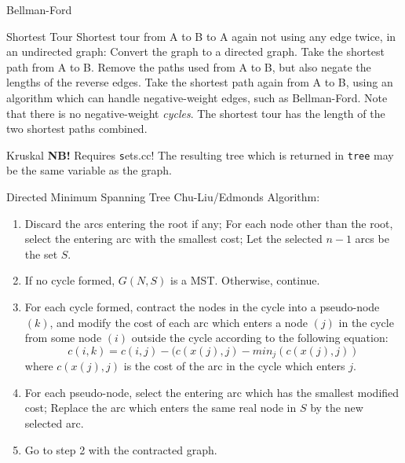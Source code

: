 \clearpage
{}
\categorycontents{}


\begin{algorithm}{Bellman-Ford}
\end{algorithm}


\begin{algorithm}{Shortest Tour}
\desc
Shortest tour from A to B to A again not using any edge twice, in an
undirected graph: Convert the graph to a directed graph.  Take the
shortest path from A to B.  Remove the paths used from A to B, but
also negate the lengths of the reverse edges.  Take the shortest path
again from A to B, using an algorithm which can handle negative-weight
edges, such as Bellman-Ford. Note that there is no negative-weight
\emph{cycles}.  The shortest tour has the length of the two shortest
paths combined. 
\end{algorithm}


\begin{algorithm}{Kruskal}
\desc
{\bf NB!} Requires {\texttt sets.cc}!
The resulting tree which is returned in {\tt tree} may
be the same variable as the graph.
\end{algorithm}

\begin{algorithm}{Directed Minimum Spanning Tree}
\desc
Chu-Liu/Edmonds Algorithm:
\begin{enumerate}

\item Discard the arcs entering the root if any; For each node other than the root, select the entering arc with the smallest cost; Let the selected $n-1$ arcs be the set $S$.

\item  If no cycle formed, $G(N,S)$ is a MST. Otherwise, continue.  


\item For each cycle formed, contract the nodes in the cycle into a pseudo-node
 $(k)$, and modify the cost of each arc which enters a node $(j)$ in the
  cycle from some node $(i)$ outside the cycle according to the
  following equation:  $$c(i,k)=c(i,j)-(c(x(j),j)-min_{j}(c(x(j),j))$$
  where $c(x(j),j)$ is the cost of the arc in the cycle which enters $j$.
  
\item For each pseudo-node, select the entering arc which has the smallest modified cost; Replace the arc which enters the same real node in $S$ by the new selected arc.

\item Go to step 2 with the contracted graph.
\end{enumerate}
\end{algorithm}




